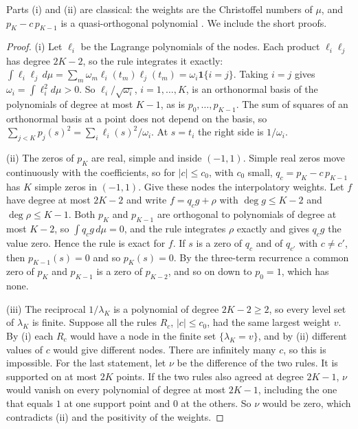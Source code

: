 \documentclass[12pt]{article}
\theoremstyle{definition}
\theoremstyle{remark}
\begin{document}
Parts (i) and (ii) are classical: the weights are the Christoffel numbers of $\mu$, and $p_K-c\,p_{K-1}$ is a quasi-orthogonal polynomial \citep{szego1975,gautschi2004}. We include the short proofs.

\begin{proof}
(i) Let $\ell_i$ be the Lagrange polynomials of the nodes. Each product $\ell_i\ell_j$ has degree $2K-2$, so the rule integrates it exactly: $\int\ell_i\ell_j\,d\mu=\sum_m\omega_m\ell_i(t_m)\ell_j(t_m)=\omega_i\mathbf 1\{i=j\}$. Taking $i=j$ gives $\omega_i=\int\ell_i^2d\mu>0$. So $\ell_i/\sqrt{\omega_i}$, $i=1,\ldots,K$, is an orthonormal basis of the polynomials of degree at most $K-1$, as is $p_0,\ldots,p_{K-1}$. The sum of squares of an orthonormal basis at a point does not depend on the basis, so $\sum_{j<K}p_j(s)^2=\sum_i\ell_i(s)^2/\omega_i$. At $s=t_i$ the right side is $1/\omega_i$.

(ii) The zeros of $p_K$ are real, simple and inside $(-1,1)$. Simple real zeros move continuously with the coefficients, so for $|c|\le c_0$, with $c_0$ small, $q_c=p_K-c\,p_{K-1}$ has $K$ simple zeros in $(-1,1)$. Give these nodes the interpolatory weights. Let $f$ have degree at most $2K-2$ and write $f=q_cg+\rho$ with $\deg g\le K-2$ and $\deg\rho\le K-1$. Both $p_K$ and $p_{K-1}$ are orthogonal to polynomials of degree at most $K-2$, so $\int q_cg\,d\mu=0$, and the rule integrates $\rho$ exactly and gives $q_cg$ the value zero. Hence the rule is exact for $f$. If $s$ is a zero of $q_c$ and of $q_{c'}$ with $c\ne c'$, then $p_{K-1}(s)=0$ and so $p_K(s)=0$. By the three-term recurrence a common zero of $p_K$ and $p_{K-1}$ is a zero of $p_{K-2}$, and so on down to $p_0=1$, which has none.

(iii) The reciprocal $1/\lambda_K$ is a polynomial of degree $2K-2\ge2$, so every level set of $\lambda_K$ is finite. Suppose all the rules $R_c$, $|c|\le c_0$, had the same largest weight $v$. By (i) each $R_c$ would have a node in the finite set $\{\lambda_K=v\}$, and by (ii) different values of $c$ would give different nodes. There are infinitely many $c$, so this is impossible. For the last statement, let $\nu$ be the difference of the two rules. It is supported on at most $2K$ points. If the two rules also agreed at degree $2K-1$, $\nu$ would vanish on every polynomial of degree at most $2K-1$, including the one that equals $1$ at one support point and $0$ at the others. So $\nu$ would be zero, which contradicts (ii) and the positivity of the weights.
\end{proof}
\end{document}
